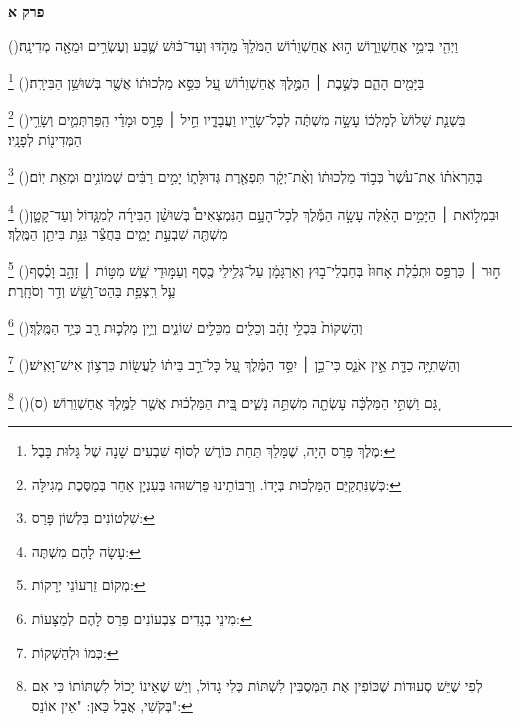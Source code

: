 \documentclass[12pt, openany]{book}
\renewcommand{\partname}[1]{}
\newcommand{\sethebfont}{
\fontsize{10.5pt}{13.1pt} \selectfont
}
\newcommand{\chapname}{}
\newcommand{\newchap}[1]{
	\addcontentsline{toc}{chapter}{#1}
	\renewcommand{\chapname}{#1}
		\begin{center}
			\textbf{%
\fontsize{16pt}{16pt}\selectfont
				#1}
		\end{center}
}
\newcommand{\footnotecomment}[1]{
	\renewcommand\thefootnote{}
	\footnote{\textsf{#1}}}
\newcommand{\commenta}[1]{\footnotecomment{#1}\hspace{0em}}
\newcommand{\vsnum}[1]{(\hebrewnumeral{#1})\space}
\begin{document}
\renewcommand{\partname}[1]{אסתר}
\fancyhead[CO]{\chapname}
\fancyhead[CE]{\partname}
\renewcommand{\sethebfont}{\fontsize{14pt}{21.0pt} \selectfont}\sethebfont
\newchap{פרק א}
\begin{multicols}{2}
\vsnum{1}וַיְהִ֖י בִּימֵ֣י אֲחַשְׁוֵר֑וֹשׁ ה֣וּא אֲחַשְׁוֵר֗וֹשׁ הַמֹּלֵךְ֙ מֵהֹ֣דּוּ וְעַד־כּ֔וּשׁ שֶׁ֛בַע וְעֶשְׂרִ֥ים וּמֵאָ֖ה מְדִינָֽה׃%
\commenta{ מֶלֶךְ פָּרַס הָיָה, שֶׁמָּלַךְ תַּחַת כּוֹרֶשׁ לְסוֹף שִׁבְעִים שָׁנָה שֶׁל גָּלוּת בָּבֶל: }%
\vsnum{2}בַּיָּמִ֖ים הָהֵ֑ם כְּשֶׁ֣בֶת ׀ הַמֶּ֣לֶךְ אֲחַשְׁוֵר֗וֹשׁ עַ֚ל כִּסֵּ֣א מַלְכוּת֔וֹ אֲשֶׁ֖ר בְּשׁוּשַׁ֥ן הַבִּירָֽה׃%
\commenta{ כְּשֶׁנִּתְקַיֵּם הַמַּלְכוּת בְּיָדוֹ. וְרַבּוֹתֵינוּ פֵּרְשׁוּהוּ בְּעִנְיָן אַחֵר בְּמַסֶּכֶת מְגִילָּה:}%
\vsnum{3}בִּשְׁנַ֤ת שָׁלוֹשׁ֙ לְמָלְכ֔וֹ עָשָׂ֣ה מִשְׁתֶּ֔ה לְכָל־שָׂרָ֖יו וַעֲבָדָ֑יו חֵ֣יל ׀ פָּרַ֣ס וּמָדַ֗י הַֽפַּרְתְּמִ֛ים וְשָׂרֵ֥י הַמְּדִינ֖וֹת לְפָנָֽיו׃%
\commenta{ שִׁלְטוֹנִים בִּלְשׁוֹן פָּרַס:}%
\vsnum{4}בְּהַרְאֹת֗וֹ אֶת־עֹ֙שֶׁר֙ כְּב֣וֹד מַלְכוּת֔וֹ וְאֶ֨ת־יְקָ֔ר תִּפְאֶ֖רֶת גְּדוּלָּת֑וֹ יָמִ֣ים רַבִּ֔ים שְׁמוֹנִ֥ים וּמְאַ֖ת יֽוֹם׃%
\commenta{ עָשָׂה לָהֶם מִשְׁתֶּה:}%
\vsnum{5}וּבִמְל֣וֹאת ׀ הַיָּמִ֣ים הָאֵ֗לֶּה עָשָׂ֣ה הַמֶּ֡לֶךְ לְכָל־הָעָ֣ם הַנִּמְצְאִים֩ בְּשׁוּשַׁ֨ן הַבִּירָ֜ה לְמִגָּ֧דוֹל וְעַד־קָטָ֛ן מִשְׁתֶּ֖ה שִׁבְעַ֣ת יָמִ֑ים בַּחֲצַ֕ר גִּנַּ֥ת בִּיתַ֖ן הַמֶּֽלֶךְ׃%
\commenta{ מְקוֹם זֵרְעוֹנֵי יְרָקוֹת:}%
\vsnum{6}ח֣וּר ׀ כַּרְפַּ֣ס וּתְכֵ֗לֶת אָחוּז֙ בְּחַבְלֵי־ב֣וּץ וְאַרְגָּמָ֔ן עַל־גְּלִ֥ילֵי כֶ֖סֶף וְעַמּ֣וּדֵי שֵׁ֑שׁ מִטּ֣וֹת ׀ זָהָ֣ב וָכֶ֗סֶף עַ֛ל רִֽצְפַ֥ת בַּהַט־וָשֵׁ֖שׁ וְדַ֥ר וְסֹחָֽרֶת׃%
\commenta{ מִינֵי בְגָדִים צִבְעוֹנִים פֵּרַס לָהֶם לְמַצָּעוֹת:}%
\vsnum{7}וְהַשְׁקוֹת֙ בִּכְלֵ֣י זָהָ֔ב וְכֵלִ֖ים מִכֵּלִ֣ים שׁוֹנִ֑ים וְיֵ֥ין מַלְכ֛וּת רָ֖ב כְּיַ֥ד הַמֶּֽלֶךְ׃%
\commenta{ כְּמוֹ וּלְהַשְׁקוֹת:}%
\vsnum{8}וְהַשְּׁתִיָּ֥ה כַדָּ֖ת אֵ֣ין אֹנֵ֑ס כִּי־כֵ֣ן ׀ יִסַּ֣ד הַמֶּ֗לֶךְ עַ֚ל כָּל־רַ֣ב בֵּית֔וֹ לַעֲשׂ֖וֹת כִּרְצ֥וֹן אִישׁ־וָאִֽישׁ׃%
\commenta{ לְפִי שֶׁיֵּשׁ סְעוּדוֹת שֶׁכּוֹפִין אֶת הַמְּסֻבִּין לִשְׁתּוֹת כְּלִי גָדוֹל, וְיֵשׁ שֶׁאֵינוֹ יָכוֹל לִשְׁתּוֹתוֹ כִּי אִם בְּקֹשִׁי, אֲבָל כַּאן: "אֵין אוֹנֵס": }%
\vsnum{9}גַּ֚ם וַשְׁתִּ֣י הַמַּלְכָּ֔ה עָשְׂתָ֖ה מִשְׁתֵּ֣ה נָשִׁ֑ים בֵּ֚ית הַמַּלְכ֔וּת אֲשֶׁ֖ר לַמֶּ֥לֶךְ אֲחַשְׁוֵרֽוֹשׁ׃ (ס)

\end{multicols}
\end{document}
